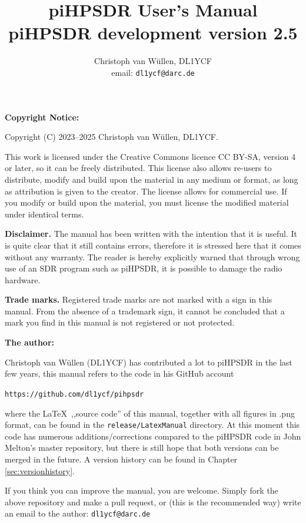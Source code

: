 \documentclass[12pt]{book}
\def\pH{pi\-HPSDR\xspace}
\begin{document}
\frontmatter
\title{
\pH User's Manual \\
\small{\pH development version 2.5}
}
\author{
Christoph van W\"ullen, DL1YCF \\
email: \texttt{dl1ycf@darc.de}
}

\maketitle
\textbf{Copyright Notice:}

Copyright (C) 2023--2025 Christoph van W\"ullen, DL1YCF.

This work is licensed under
the Creative Commons licence CC BY-SA, version 4 or later, so it can be freely distributed.
This license also allows re-users to distribute, modify and build upon the material in any medium or format,
as long as attribution is given to the creator. The license allows for commercial use.
If you modify or build upon the material, you must license the modified material under identical terms.

\textbf{Disclaimer.} The manual has been written with the intention that it is useful. It is quite clear
that it still contains errors, therefore it is stressed here that it comes without any warranty. The reader
is hereby explicitly warned that through wrong use of an SDR program such as \pH, it is possible to
damage the radio hardware.

\textbf{Trade marks.} Registered trade marks are not marked with a sign in this manual. From the absence of
a trademark sign, it cannot be concluded that a mark you find in this manual is not registered or not
protected.

\bigskip
\textbf{The author:}

Christoph van W\"ullen (DL1YCF) has contributed a lot to \pH in the last few years, this manual refers
to the code in his GitHub account

\texttt{https://github.com/dl1ycf/pihpsdr}

where the \LaTeX\   ,,source code'' of this manual, together with all figures in .png format, can be found
in the \texttt{release/LatexManual} directory. At this moment this code has numerous additions/corrections
compared
to the \pH code in John Melton's master repository, but there is still hope that both versions can
be merged in  the  future. A version history can be found in Chapter \ref{sec:versionhistory}.

If you think you can improve the manual, you are welcome.
Simply fork the above repository and make a pull request, or (this is the recommended way) write an
email to the author: \texttt{dl1ycf@darc.de}
\tableofcontents
\mainmatter
\end{document}
